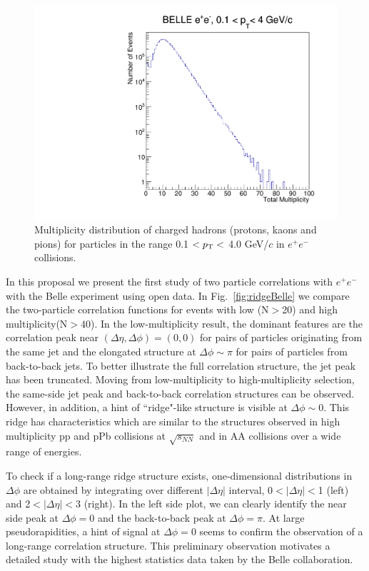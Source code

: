\begin{figure}[!htb]
\begin{center}
\includegraphics[width=.45\textwidth]{figures/total_mult.pdf}
\caption{Multiplicity distribution of charged hadrons (protons, kaons and pions) for  particles in the range  0.1 $<p_{\rm T}<$ 4.0 GeV/$c$ in $e^{+}e^{-}$ collisions. }
\label{fig:multHadron} 
\end{center}
\end{figure}

In this proposal we present the first study of two particle correlations with $e^{+}e^{-}$ with the Belle experiment using open data.
In Fig.~\ref{fig:ridgeBelle} we compare the two-particle correlation functions for events with low (N$>$20) and high multiplicity(N$>40$). 
In the low-multiplicity result, the dominant features are the correlation peak near $(\Delta\eta,\Delta\phi)=(0,0)$ for pairs of particles originating from the same jet 
and the elongated structure at $\Delta\phi\sim\pi$ for pairs of particles from back-to-back jets. To better illustrate the full correlation structure, the jet peak has been truncated.
Moving from low-multiplicity to high-multiplicity selection, the same-side jet peak and back-to-back correlation structures can be observed. 
However, in addition, a hint of ``ridge"-like structure is visible at $\Delta\phi \sim$0. This ridge has characteristics which are similar to the structures
observed in high multiplicity pp and pPb collisions at $\sqrt{s_{NN}}$ and in AA collisions over a wide range of energies.

To check if a long-range ridge structure exists, one-dimensional distributions in $\Delta\phi$ are obtained by integrating over different $|\Delta\eta|$ interval, 0$<|\Delta \eta|<$1 (left) and 
2$<|\Delta \eta|<$3 (right). In the left side plot, we can clearly identify the near side peak at $\Delta\phi=$0 and the back-to-back peak at $\Delta\phi=\pi$. At large pseudorapidities, 
a hint of signal at $\Delta\phi=0$ seems to confirm the observation of a long-range correlation structure. This preliminary observation motivates a detailed study with the highest 
statistics data taken by the Belle collaboration. 

